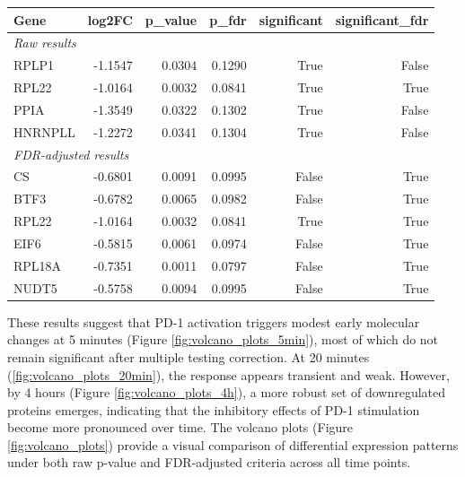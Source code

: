 \documentclass{article}
\begin{document}
\begin{table}[H]
        \vspace{1em}

        \begin{tabular}{lrrrrr}
          \toprule
          Gene & log2FC & p\_value & p\_fdr & significant & significant\_fdr \\
          \midrule
          \multicolumn{6}{l}{\textit{Raw results}} \\
          RPLP1    & -1.1547 & 0.0304 & 0.1290 & True & False \\
          RPL22    & -1.0164 & 0.0032 & 0.0841 & True & True  \\
          PPIA     & -1.3549 & 0.0322 & 0.1302 & True & False \\
          HNRNPLL  & -1.2272 & 0.0341 & 0.1304 & True & False \\
          \midrule
          \multicolumn{6}{l}{\textit{FDR-adjusted results}} \\
          CS     & -0.6801 & 0.0091 & 0.0995 & False & True \\
          BTF3   & -0.6782 & 0.0065 & 0.0982 & False & True \\
          RPL22  & -1.0164 & 0.0032 & 0.0841 & True  & True \\
          EIF6   & -0.5815 & 0.0061 & 0.0974 & False & True \\
          RPL18A & -0.7351 & 0.0011 & 0.0797 & False & True \\
          NUDT5  & -0.5758 & 0.0094 & 0.0995 & False & True \\
          \bottomrule
        \end{tabular}

      \end{table}

      These results suggest that PD-1 activation triggers modest early molecular changes at 5 minutes (Figure \ref{fig:volcano_plots_5min}), most of which do not remain significant after multiple testing correction. At 20 minutes (\ref{fig:volcano_plots_20min}), the response appears transient and weak. However, by 4 hours (Figure \ref{fig:volcano_plots_4h}), a more robust set of downregulated proteins emerges, indicating that the inhibitory effects of PD-1 stimulation become more pronounced over time. The volcano plots (Figure \ref{fig:volcano_plots}) provide a visual comparison of differential expression patterns under both raw p-value and FDR-adjusted criteria across all time points.
\end{document}
